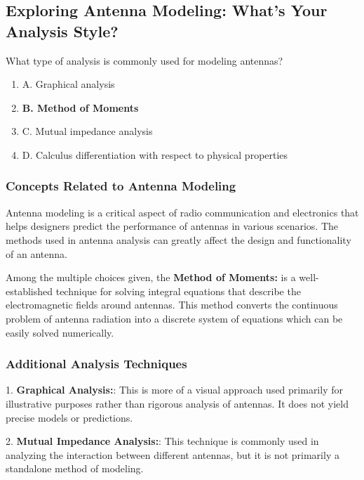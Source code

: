 \subsection{Exploring Antenna Modeling: What's Your Analysis Style?}

\begin{tcolorbox}[colback=gray!10, colframe=black, title=E9B09] What type of analysis is commonly used for modeling antennas?
\begin{enumerate}[label=\Alph*)]
    \item A. Graphical analysis
    \item \textbf{B. Method of Moments}
    \item C. Mutual impedance analysis
    \item D. Calculus differentiation with respect to physical properties
\end{enumerate} \end{tcolorbox}

\subsubsection{Concepts Related to Antenna Modeling}

Antenna modeling is a critical aspect of radio communication and electronics that helps designers predict the performance of antennas in various scenarios. The methods used in antenna analysis can greatly affect the design and functionality of an antenna. 

Among the multiple choices given, the \textbf{Method of Moments:} is a well-established technique for solving integral equations that describe the electromagnetic fields around antennas. This method converts the continuous problem of antenna radiation into a discrete system of equations which can be easily solved numerically. 

\subsubsection{Additional Analysis Techniques}

1. \textbf{Graphical Analysis:}: This is more of a visual approach used primarily for illustrative purposes rather than rigorous analysis of antennas. It does not yield precise models or predictions.

2. \textbf{Mutual Impedance Analysis:}: This technique is commonly used in analyzing the interaction between different antennas, but it is not primarily a standalone method of modeling.


